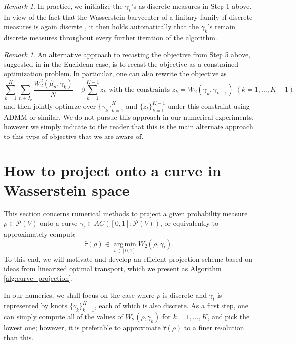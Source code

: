 \documentclass[aos, preprint]{imsart}
\theoremstyle{plain}
\theoremstyle{remark}
\newtheorem{rem}[example]{Remark}
\DeclareMathOperator*{\argmin}{arg\,min}
\begin{document}
\begin{appendix}
\begin{rem}
In practice, we initialize the $\gamma_k$'s as discrete measures in Step 1 above. In view of the fact that the  Wasserstein barycenter of a finitary family of discrete measures is again discrete \cite{anderes2016discrete}, it then holds automatically that the $\gamma_k$'s remain discrete measures throughout every further iteration of the algorithm.
\end{rem}

\begin{rem}
An alternative approach to recasting the objective from Step 5 above, suggested in \cite{kirov2017multiple} in the Euclidean
case, is to recast the objective as a constrained optimization problem.
In particular, one can also rewrite the objective as
\[
\sum_{k=1}^{K}\sum_{n\in I_{k}}\frac{W_{2}^{2}(\hat{\mu}_{n},\gamma_{k})}{N}+\beta\sum_{k=1}^{K-1}z_{k}\text{ with the constraints }z_{k}=W_{2}(\gamma_{k},\gamma_{k+1})\;(k=1,\ldots,K-1)
\]
and then jointly optimize over $\{\gamma_{k}\}_{k=1}^{K}$ and $\{z_{k}\}_{k=1}^{K-1}$
under this constraint using ADMM or similar. We do not pursue this
approach in our numerical experiments, however we simply indicate
to the reader that this is the main alternate approach to this type
of objective that we are aware of.

\end{rem}




\section{How to project onto a curve in Wasserstein space}
\label{appn:linearized-ot-projection-scheme}
This section concerns numerical methods to project a given probability
measure $\rho\in\mathcal{P}(V)$ onto a curve $\gamma_{t}\in AC([0,1];\mathcal{P}(V))$,
or equivalently to approximately compute
\[
\hat{\tau}(\rho)\in\argmin\limits_{t\in[0,1]}W_{2}(\rho,\gamma_{t}).
\]
To this end, we will motivate and develop an efficient projection scheme based on ideas from linearized optimal transport, which we present as Algorithm \ref{alg:curve_projection}.

In our numerics, we shall focus on the case where $\rho$ is discrete and $\gamma_{t}$ is
represented by knots $\{\gamma_{k}\}_{k=1}^{K}$, each of which is
also discrete. As a first step, one can simply compute all of the
values of $W_{2}(\rho,\gamma_{k})$ for $k=1,\ldots,K$, and pick
the lowest one; however, it is preferable to approximate $\hat{\tau}(\rho)$
to a finer resolution than this.


\end{appendix}
\end{document}

